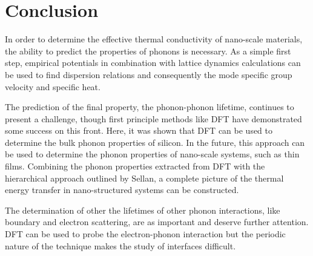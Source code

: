 \documentclass{article}
\numberwithin{equation}{section}
\begin{document}
\section{Conclusion}

In order to determine the effective thermal conductivity of nano-scale materials, the ability to predict the properties of phonons is necessary. As a simple first step, empirical potentials in combination with lattice dynamics calculations can be used to find dispersion relations and consequently the mode specific group velocity and specific heat. 

The prediction of the final property, the phonon-phonon lifetime, continues to present a challenge, though first principle methods like DFT have demonstrated some success on this front. Here, it was shown that DFT can be used to determine the bulk phonon properties of silicon. In the future, this approach can be used to determine the phonon properties of nano-scale systems, such as thin films. Combining the phonon properties extracted from DFT with the hierarchical approach outlined by Sellan, a complete picture of the thermal energy transfer in nano-structured systems can be constructed.

The determination of other the lifetimes of other phonon interactions, like boundary and electron scattering, are as important and deserve further attention. DFT can be used to probe the electron-phonon interaction but the periodic nature of the technique makes the study of interfaces difficult.
\newpage
\end{document}
